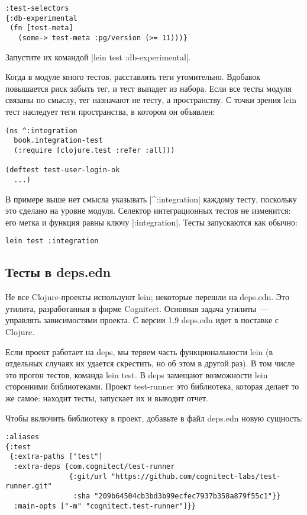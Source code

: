 \begin{verbatim}
:test-selectors
{:db-experimental
 (fn [test-meta]
   (some-> test-meta :pg/version (>= 11)))}
\end{verbatim}

Запустите их командой \spverb|lein test :db-experimental|.

Когда в модуле много тестов, расставлять теги утомительно. Вдобавок повышается
риск забыть тег, и тест выпадет из набора. Если все тесты модуля связаны по
смыслу, тег назначают не тесту, а пространству. С точки зрения lein тест
наследует теги пространства, в котором он объявлен:

\begin{verbatim}
(ns ^:integration
  book.integration-test
  (:require [clojure.test :refer :all]))

(deftest test-user-login-ok
  ...)
\end{verbatim}

В примере выше нет смысла указывать \spverb|^:integration| каждому тесту,
поскольку это сделано на уровне модуля. Селектор интеграционных тестов не
изменится: его метка и функция равны ключу \spverb|:integration|. Тесты
запускаются как обычно:

\begin{verbatim}
lein test :integration
\end{verbatim}

\subsection{Тесты в deps.edn}

Не все Clojure-проекты используют lein; некоторые перешли на deps.edn. Это
утилита, разработанная в фирме Cognitect. Основная задача утилиты~--- управлять
зависимостями проекта. С версии 1.9 deps.edn идет в поставке с Clojure.

Если проект работает на deps, мы теряем часть функциональности lein (в отдельных
случаях их удается скрестить, но об этом в другой раз). В том числе это прогон
тестов, команда lein test. В deps замещают возможности lein сторонними
библиотеками. Проект test-runner это библиотека, которая делает то же самое:
находит тесты, запускает их и выводит отчет.

Чтобы включить библиотеку в проект, добавьте в файл deps.edn новую сущность:

\begin{verbatim}
:aliases
{:test
 {:extra-paths ["test"]
  :extra-deps {com.cognitect/test-runner
               {:git/url "https://github.com/cognitect-labs/test-runner.git"
                :sha "209b64504cb3bd3b99ecfec7937b358a879f55c1"}}
  :main-opts ["-m" "cognitect.test-runner"]}}
\end{verbatim}

